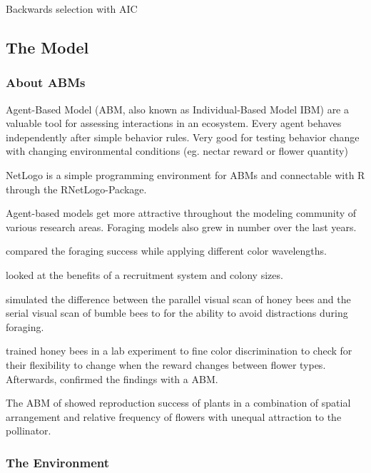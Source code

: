 Backwards selection with AIC




\newpage


\subsection{The Model}


\subsubsection{About ABMs}
Agent-Based Model (ABM, also known as Individual-Based Model IBM) are a valuable tool for assessing interactions in an ecosystem. Every agent behaves independently after simple behavior rules. 
Very good for testing behavior change with changing environmental conditions (eg. nectar reward or flower quantity)

NetLogo \citep{wilensky1999netlogo} is a simple programming environment for ABMs and connectable with R through the RNetLogo-Package.

Agent-based models get more attractive throughout the modeling community of various research areas. Foraging models also grew in number over the last years.



\citet{faruq2013biological} compared the foraging success while applying different color wavelengths.

\citet{dornhaus2006benefits} looked at the benefits of a recruitment system and colony sizes.
 
\citet{bukovac2013bees} simulated the difference between the parallel visual scan of honey bees and the serial visual scan of bumble bees to for the ability to avoid distractions during foraging. 

\citet{dyer2014bee} trained honey bees in a lab experiment to fine color discrimination to check for their flexibility to change when the reward changes between flower types. Afterwards,  \citet{dyer2014bee} confirmed the findings with a ABM. 

The ABM of \citet{hanoteaux2013effects} showed reproduction success of plants in a combination of spatial arrangement and relative frequency of flowers with unequal attraction to the pollinator. 



\subsubsection{The Environment}

